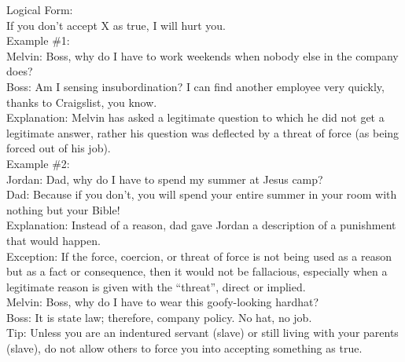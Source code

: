 \documentclass[a4paper,12pt,single,pdftex]{scrartcl}
\begin{document}
    
      Logical Form:
    \\

    
      If you don’t accept X as true, I will hurt you.
    \\

    
      Example \#1:
    \\

    
      Melvin: Boss, why do I have to work weekends when nobody else in the company does?
    \\

    
      Boss: Am I sensing insubordination?  I can find another employee very quickly, thanks to Craigslist, you know.
    \\

    
      Explanation: Melvin has asked a legitimate question to which he did not get a legitimate answer, rather his question was deflected by a threat of force (as being forced out of his job).
    \\

    
      Example \#2:
    \\

    
      Jordan: Dad, why do I have to spend my summer at Jesus camp?
    \\

    
      Dad: Because if you don’t, you will spend your entire summer in your room with nothing but your Bible!
    \\

    
      Explanation: Instead of a reason, dad gave Jordan a description of a punishment that would happen.
    \\

    
      Exception:  If the force, coercion, or threat of force is not being used as a reason but as a fact or consequence, then it would not be fallacious, especially when a legitimate reason is given with the “threat”, direct or implied. 
    \\

    
      Melvin: Boss, why do I have to wear this goofy-looking hardhat?
    \\

    
      Boss: It is state law; therefore, company policy.  No hat, no job.
    \\

    
      Tip: Unless you are an indentured servant (slave) or still living with your parents (slave), do not allow others to force you into accepting something as true.
    \\
\end{document}
